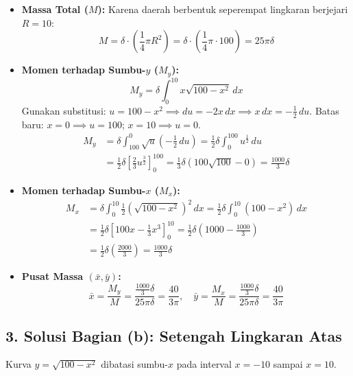 \documentclass[12pt,a4paper]{article}
\begin{document}
\begin{itemize}
  \item \textbf{Massa Total ($M$):}
    Karena daerah berbentuk seperempat lingkaran berjejari $R=10$:
    \begin{equation*}
      M = \delta \cdot \left(\frac{1}{4} \pi R^2\right) = \delta \cdot \left(\frac{1}{4} \pi \cdot 100\right) = 25\pi\delta
    \end{equation*}

  \item \textbf{Momen terhadap Sumbu-$y$ ($M_y$):}
    \begin{equation*}
      M_y = \delta \int_{0}^{10} x \sqrt{100 - x^2} \, dx
    \end{equation*}
    Gunakan substitusi: $u = 100 - x^2 \implies du = -2x \, dx \implies x \, dx = -\frac{1}{2} \, du$.
    Batas baru: $x=0 \implies u=100$; \quad $x=10 \implies u=0$.
    \begin{align*}
      M_y &= \delta \int_{100}^{0} \sqrt{u} \left(-\frac{1}{2} \, du\right) = \frac{1}{2}\delta \int_{0}^{100} u^{\frac{1}{2}} \, du \\
      &= \frac{1}{2}\delta \left[ \frac{2}{3}u^{\frac{3}{2}} \right]_{0}^{100} = \frac{1}{3}\delta \left( 100\sqrt{100} - 0 \right) = \frac{1000}{3}\delta
    \end{align*}

  \item \textbf{Momen terhadap Sumbu-$x$ ($M_x$):}
    \begin{align*}
      M_x &= \delta \int_{0}^{10} \frac{1}{2} \left(\sqrt{100 - x^2}\right)^2 \, dx = \frac{1}{2}\delta \int_{0}^{10} (100 - x^2) \, dx \\
      &= \frac{1}{2}\delta \left[ 100x - \frac{1}{3}x^3 \right]_{0}^{10} = \frac{1}{2}\delta \left( 1000 - \frac{1000}{3} \right) \\
      &= \frac{1}{2}\delta \left( \frac{2000}{3} \right) = \frac{1000}{3}\delta
    \end{align*}

  \item \textbf{Pusat Massa $(\bar{x}, \bar{y})$:}
    \begin{equation*}
      \bar{x} = \frac{M_y}{M} = \frac{\frac{1000}{3}\delta}{25\pi\delta} = \frac{40}{3\pi}, \quad \bar{y} = \frac{M_x}{M} = \frac{\frac{1000}{3}\delta}{25\pi\delta} = \frac{40}{3\pi}
    \end{equation*}
\end{itemize}

\subsection*{3. Solusi Bagian (b): Setengah Lingkaran Atas}
Kurva $y = \sqrt{100 - x^2}$ dibatasi sumbu-$x$ pada interval $x = -10$ sampai $x = 10$.
\end{document}
